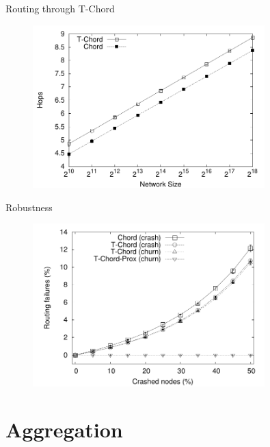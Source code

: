 \begin{frame}{Routing through T-Chord}

\begin{figure}
	\includegraphics[width=0.80\textwidth]{figs/11/chord-routing}
\end{figure}	


\end{frame}

\begin{frame}{Robustness}

\begin{figure}
	\includegraphics[width=0.80\textwidth]{figs/11/chord-crash-fail}
\end{figure}	


\end{frame}

\section{Aggregation}

